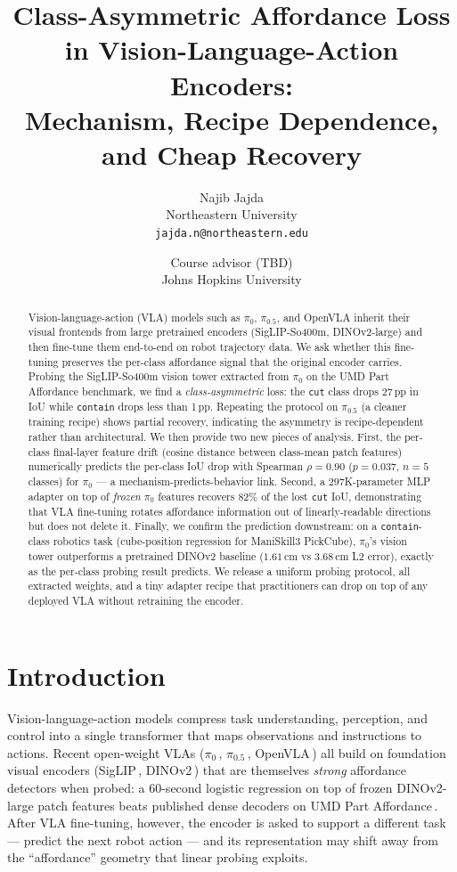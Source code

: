 \documentclass[10pt]{article}
\title{\textbf{Class-Asymmetric Affordance Loss in Vision-Language-Action Encoders:\\
Mechanism, Recipe Dependence, and Cheap Recovery}}
\author{Najib Jajda \\ Northeastern University \\ \texttt{jajda.n@northeastern.edu}
\and Course advisor (TBD) \\ Johns Hopkins University}
\date{}
\begin{document}
\maketitle

\begin{abstract}
Vision-language-action (VLA) models such as $\pi_0$, $\pi_{0.5}$, and OpenVLA
inherit their visual frontends from large pretrained encoders (SigLIP-So400m,
DINOv2-large) and then fine-tune them end-to-end on robot trajectory data. We
ask whether this fine-tuning preserves the per-class affordance signal that
the original encoder carries. Probing the SigLIP-So400m vision tower
extracted from $\pi_0$ on the UMD Part Affordance benchmark, we find a
\emph{class-asymmetric} loss: the \texttt{cut} class drops 27\,pp in IoU
while \texttt{contain} drops less than 1\,pp. Repeating the protocol on
$\pi_{0.5}$ (a cleaner training recipe) shows partial recovery, indicating
the asymmetry is recipe-dependent rather than architectural. We then provide
two new pieces of analysis. First, the per-class final-layer feature drift
(cosine distance between class-mean patch features) numerically predicts the
per-class IoU drop with Spearman $\rho = 0.90$ ($p = 0.037$, $n = 5$
classes) for $\pi_0$ — a mechanism-predicts-behavior link. Second, a
$297$K-parameter MLP adapter on top of \emph{frozen} $\pi_0$ features
recovers $82\%$ of the lost \texttt{cut} IoU, demonstrating that VLA
fine-tuning rotates affordance information out of linearly-readable
directions but does not delete it. Finally, we confirm the prediction
downstream: on a \texttt{contain}-class robotics task (cube-position
regression for ManiSkill3 PickCube), $\pi_0$'s vision tower outperforms a
pretrained DINOv2 baseline ($1.61$\,cm vs $3.68$\,cm L2 error), exactly as
the per-class probing result predicts. We release a uniform probing
protocol, all extracted weights, and a tiny adapter recipe that practitioners
can drop on top of any deployed VLA without retraining the encoder.
\end{abstract}

\section{Introduction}

Vision-language-action models compress task understanding, perception, and
control into a single transformer that maps observations and instructions to
actions. Recent open-weight VLAs ($\pi_0$\,\cite{black2024pi0},
$\pi_{0.5}$\,\cite{intelligence2024pi05}, OpenVLA\,\cite{kim2024openvla}) all
build on foundation visual encoders (SigLIP\,\cite{zhai2023sigmoid},
DINOv2\,\cite{oquab2024dinov2}) that are themselves \emph{strong} affordance
detectors when probed: a 60-second logistic regression on top of frozen
DINOv2-large patch features beats published dense decoders on UMD Part
Affordance\,\cite{myers2015affordance}. After VLA fine-tuning, however, the
encoder is asked to support a different task — predict the next robot action
— and its representation may shift away from the ``affordance'' geometry
that linear probing exploits.
\end{document}
